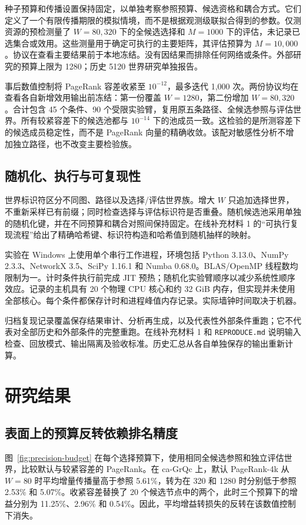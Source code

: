 \documentclass[smallextended]{svjour3}
\begin{document}
种子预算和传播设置保持固定，以单独考察参照预算、候选资格和耦合方式。它们定义了一个有限传播期限的模拟情境，而不是根据观测级联拟合得到的参数。仅测资源的预检测量了 $W=80,320$ 下的全候选选择和 $M=1000$ 下的评估，未记录已选集合或效用。这些测量用于确定可执行的主要矩阵，其评估预算为 $M=10,000$。协议在查看主要结果前于本地冻结。没有因结果而排除任何网络或条件。外部研究的预算上限为 1280；历史 5120 世界研究单独报告。

事后数值控制将 PageRank 容差收紧至 $10^{-12}$，最多迭代 1,000 次。两份协议均在查看各自新增效用输出前冻结：第一份覆盖 $W=1280$，第二份增加 $W=80,320$。合计包含 45 个条件、90 个受限实验臂，复用原五条路径、全候选参照与评估世界。所有较紧容差下的候选池都与 $10^{-14}$ 下的池成员一致。这检验的是所测容差下的候选成员稳定性，而不是 PageRank 向量的精确收敛。该配对敏感性分析不增加独立路径，也不改变主要检验族。

\subsection{随机化、执行与可复现性}
世界标识符区分不同图、路径以及选择/评估世界族。增大 $W$ 只追加选择世界，不重新采样已有前缀；同时检查选择与评估标识符是否重叠。随机候选池采用单独的随机化键，并在不同预算和耦合对照间保持固定。在线补充材料 1 的“可执行复现流程”给出了精确哈希键、标识符构造和哈希值到随机抽样的映射。

实验在 Windows 上使用单个串行工作进程，环境包括 Python 3.13.0、NumPy 2.3.3、NetworkX 3.5、SciPy 1.16.1 和 Numba 0.68.0。BLAS/OpenMP 线程数均限制为一。计时条件执行前完成 JIT 预热；随机化实验臂顺序以减少系统性顺序效应。记录的主机具有 20 个物理 CPU 核心和约 32 GiB 内存，但实现并未使用全部核心。每个条件都保存计时和进程峰值内存记录。实际墙钟时间取决于机器。

归档复现记录覆盖保存结果审计、分析再生成，以及代表性外部条件重跑；它不代表对全部历史和外部条件的完整重跑。在线补充材料 1 和 \texttt{REPRODUCE.md} 说明输入检查、回放模式、输出隔离及验收标准。历史汇总从各自单独保存的输出重新计算。

\section{研究结果}
\subsection{表面上的预算反转依赖排名精度}
图~\ref{fig:precision-budget} 在每个选择预算下，使用相同全候选参照和独立评估世界，比较默认与较紧容差的 PageRank。在 ca-GrQc 上，默认 PageRank-4k 从 $W=80$ 时平均增量传播量高于参照 5.61\%，转为在 320 和 1280 时分别低于参照 2.53\% 和 5.07\%。收紧容差替换了 20 个候选节点中的两个，此时三个预算下的增益分别为 11.25\%、2.96\% 和 0.54\%。因此，平均增益转损失的反转在该数值控制下消失。
\end{document}
